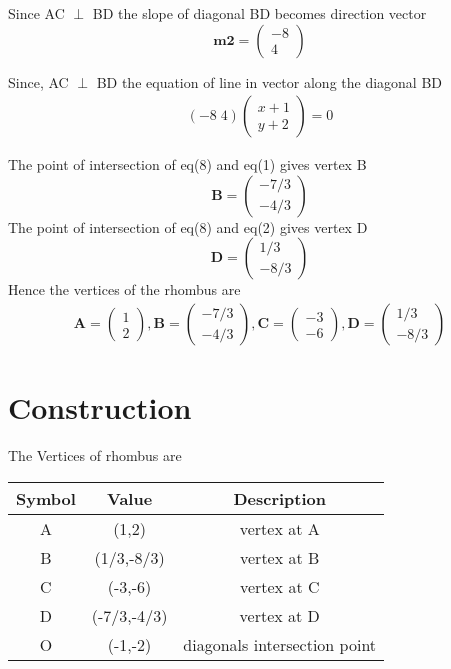 \documentclass[journal,10pt,twocolumn]{article}
\let\vec\mathbf
\newcommand{\myvec}[1]{\ensuremath{\begin{pmatrix}#1\end{pmatrix}}}
\begin{document}
Since AC $\perp$ BD the slope of diagonal BD becomes direction vector
\begin{equation}
\vec{m2}=\myvec{-8\\4}
\end{equation}



Since, AC $\perp$ BD the equation of line in vector along the diagonal BD 
\begin{eqnarray}
	(-8\;4) \myvec{x+1\\y+2}=0
	\label{eq6}
\end{eqnarray}

The point of intersection of eq(8) and eq(1) gives vertex B
\begin{equation}
	\vec{B} = \myvec{-7/3\\-4/3}
	\label{eq7}
\end{equation}
The point of intersection of eq(8) and eq(2) gives vertex D
\begin{equation}
	\vec{D} = \myvec{1/3\\-8/3}
	\label{eq8}
\end{equation}
 Hence the vertices of the rhombus are
 \begin{eqnarray}
	\vec{A} = \myvec{1\\2},
	\vec{B} = \myvec{-7/3\\-4/3},
	\vec{C} = \myvec{-3\\-6},
	\vec{D} = \myvec{1/3\\-8/3}
\end{eqnarray}
 



\section*{\large Construction}
The Vertices of rhombus are
\vspace{6mm}

{
\setlength\extrarowheight{5pt}
\begin{tabular}{|c|c|c|}
	\hline
	\textbf{Symbol}&\textbf{Value}&\textbf{Description}\\
	\hline
	A&(1,2)&vertex at A\\
	\hline
	B&(1/3,-8/3)&vertex at B\\
	\hline
	C&(-3,-6)&vertex at C\\
	\hline
	D&(-7/3,-4/3)&vertex at D\\
	\hline
	O&(-1,-2)& diagonals intersection point\\
	\hline
\end{tabular}
}
\end{document}
